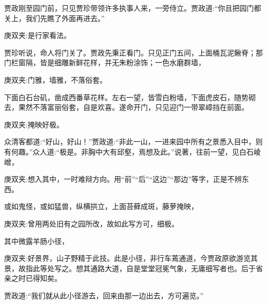 \begin{parag}
    贾政刚至园门前，只见贾珍带领许多执事人来，一旁侍立。贾政道:“你且把园门都关上，我们先瞧了外面再进去。”\begin{note}庚双夹:是行家看法。\end{note}贾珍听说，命人将门关了。贾政先秉正看门。只见正门五间，上面桶瓦泥鳅脊；那门栏窗隔，皆是细雕新鲜花样，并无朱粉涂饰；一色水磨群墙，\begin{note}庚双夹:门雅，墙雅，不落俗套。\end{note}下面白石台矶，凿成西番草花样。左右一望，皆雪白粉墙，下面虎皮石，随势砌去，果然不落富丽俗套，自是欢喜。遂命开门，只见迎门一带翠嶂挡在前面。\begin{note}庚双夹:掩映好极。\end{note}众清客都道:“好山，好山！”贾政道:“非此一山，一进来园中所有之景悉入目中，则有何趣。”众人道:“极是。非胸中大有邱壑，焉想及此。”说著，往前一望，见白石崚嶒，\begin{note}庚双夹:想入其中，一时难辩方向。用“前”“后”“这边”“那边”等字，正是不辨东西。\end{note}或如鬼怪，或如猛兽，纵横拱立，上面苔藓成斑，藤萝掩映，\begin{note}庚双夹:曾用两处旧有之园所改，故如此写方可，细极。\end{note}其中微露羊肠小径，\begin{note}庚双夹:好景界，山子野精于此技。此是小径，非行车蔫通道，今贾政原欲游览其景，故指此等处写之。想其通路大道，自是堂堂冠冕气象，无庸细写者也。后于省亲之时已得知矣。\end{note}贾政道:“我们就从此小径游去，回来由那一边出去，方可遍览。”
\end{parag}



